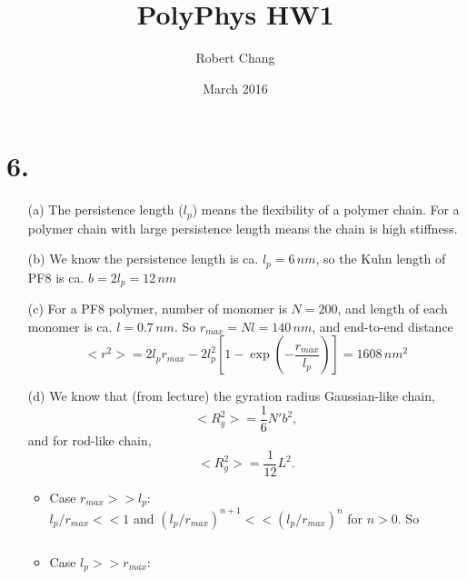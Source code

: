 \documentclass{article}
\title{PolyPhys HW1}
\author{Robert Chang}
\date{March 2016}
\begin{document}
\maketitle

\section*{6.} 
\begin{enumerate}
    \item[(a)] The persistence length ($l_p$) means the flexibility of a polymer chain. For a polymer chain with large persistence length means the chain is high stiffness.
    
    \item[(b)] We know the persistence length is ca. $l_p=6\,nm$, so the Kuhn length of PF8 is ca. $b=2l_p=12\,nm$
    
    \item[(c)] For a PF8 polymer, number of monomer is $N=200$, and length of each monomer is ca. $l=0.7\,nm$. So $r_{max} = Nl = 140\,nm$, and end-to-end distance 
    \[
    <r^2> = 2 l_p r_{max} - 2 l_p^2 \left[ 1- \exp \left(-\frac{r_{max}}{l_p} \right)\right] 
    = 1608\, nm^2
    \]
    \item[(d)] We know that (from lecture) the gyration radius Gaussian-like chain, 
    \[
    <R_g^2> = \frac{1}{6} N' b^2,
    \]
    and for rod-like chain,  
    \[
    <R_g^2> = \frac{1}{12} L^2.
    \]
    \begin{itemize}
        \item Case $r_{max} >> l_p$: \\
        $l_p / r_{max} << 1$ and $(l_p / r_{max} )^{n+1}<< (l_p / r_{max} )^{n}$ for  $n >0$.
        So
    \[
    \begin{align*}
         \\
    \end{align*}
    \]
        
        
        \item Case $l_p >> r_{max}$:
        
        
        
    \end{itemize}
 
    
\end{enumerate}
\end{document}

